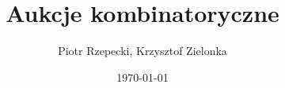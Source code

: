 \documentclass{beamer}
\title{Aukcje kombinatoryczne}
\author{Piotr Rzepecki, Krzysztof Zielonka}
\date{\today}
\begin{document}
\frame{\titlepage}



\end{document}

